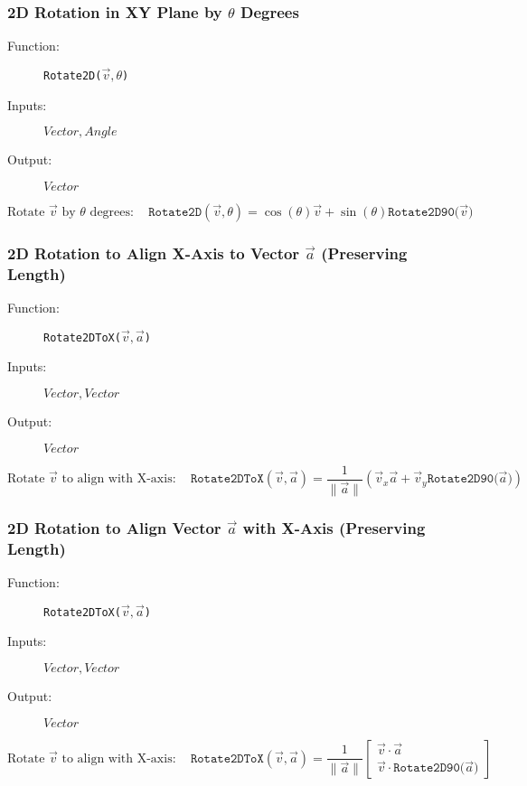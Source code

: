 \documentclass{article}
\begin{document}
\subsubsection{2D Rotation in XY Plane by \(\theta\) Degrees}

\begin{description}
\item[Function:] \texttt{Rotate2D(\(\vec{v}, \theta\))}
\item[Inputs:] $Vector, Angle$
\item[Output:] $Vector$
\end{description}

\[
\text{Rotate } \vec{v} \text{ by } \theta \text{ degrees} :
\quad \texttt{Rotate2D}(\vec{v}, \theta) =
\cos(\theta) \vec{v} + \sin(\theta) \texttt{Rotate2D90(\(\vec{v}\))}
\]

\subsubsection{2D Rotation to Align X-Axis to Vector \(\vec{a}\) (Preserving Length)}

\begin{description}
\item[Function:] \texttt{Rotate2DToX(\(\vec{v}, \vec{a}\))}
\item[Inputs:] $Vector, Vector$
\item[Output:] $Vector$
\end{description}

\[
\text{Rotate } \vec{v} \text{ to align with X-axis} : \quad \texttt{Rotate2DToX}(\vec{v}, \vec{a}) = \frac{1}{\| \vec{a} \|}  (
\vec{v}_x \vec{a} + \vec{v}_y \texttt{Rotate2D90(\(\vec{a}\))}
)
\]

\subsubsection{2D Rotation to Align Vector \(\vec{a}\) with X-Axis (Preserving Length)}

\begin{description}
\item[Function:] \texttt{Rotate2DToX(\(\vec{v}, \vec{a}\))}
\item[Inputs:] $Vector, Vector$
\item[Output:] $Vector$
\end{description}

\[
\text{Rotate } \vec{v} \text{ to align with X-axis} : \quad \texttt{Rotate2DToX}(\vec{v}, \vec{a}) = \frac{1}{\| \vec{a} \|} \begin{bmatrix}
\vec{v} \cdot \vec{a} \\
\vec{v} \cdot \texttt{Rotate2D90(\(\vec{a}\))}
\end{bmatrix}
\]
\end{document}
